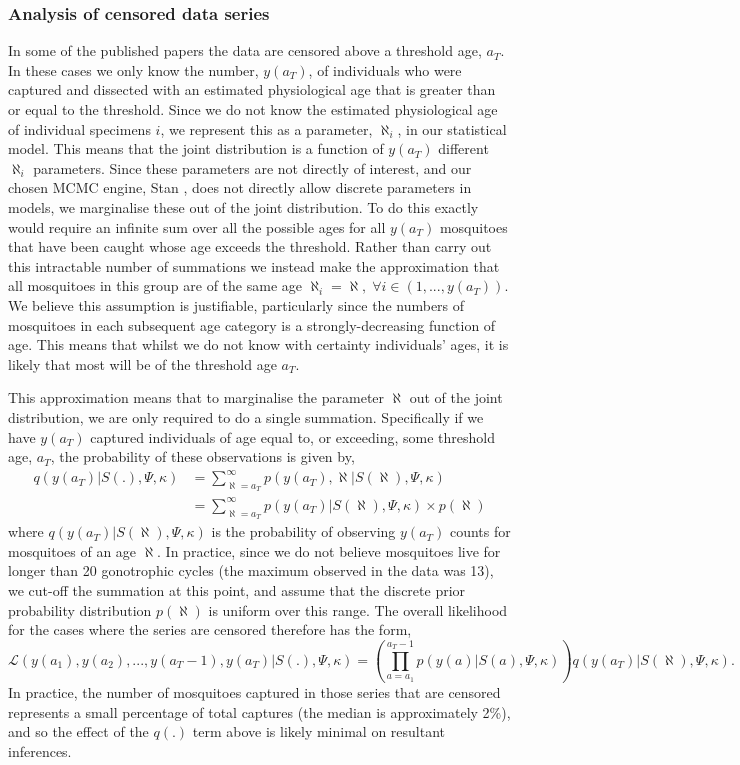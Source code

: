 \documentclass[12pt]{article}
\begin{document}
{\subsubsection{Analysis of censored data series}\label{sec:dissection_censored}
In some of the published papers the data are censored above a threshold age, $a_T$. In these cases we only know the number, $y(a_T)$, of individuals who were captured and dissected with an estimated physiological age that is greater than or equal to the threshold. Since we do not know the estimated physiological age of individual specimens $i$, we represent this as a parameter, $\aleph_i$, in our statistical model. This means that the joint distribution is a function of $y(a_T)$ different $\aleph_i$ parameters. Since these parameters are not directly of interest, and our chosen MCMC engine, Stan \citep{stan-software:2014}, does not directly allow discrete parameters in models, we marginalise these out of the joint distribution. To do this exactly would require an infinite sum over all the possible ages for all $y(a_T)$ mosquitoes that have been caught whose age exceeds the threshold. Rather than carry out this intractable number of summations we instead make the approximation that all mosquitoes in this group are of the same age $\aleph_i = \aleph,\; \forall i \in (1,...,y(a_T))$. We believe this assumption is justifiable, particularly since the numbers of mosquitoes in each subsequent age category is a strongly-decreasing function of age. This means that whilst we do not know with certainty individuals' ages, it is likely that most will be of the threshold age $a_T$.

This approximation means that to marginalise the parameter $\aleph$ out of the joint distribution, we are only required to do a single summation. Specifically if we have $y(a_T)$ captured individuals of age equal to, or exceeding, some threshold age, $a_T$, the probability of these observations is given by,
%
\begin{align}
q(y(a_T)|S(.),\Psi,\kappa) &= \sum_{\aleph=a_T}^{\infty} p(y(a_T),\aleph|S(\aleph),\Psi,\kappa)\\
&= \sum_{\aleph=a_T}^{\infty} p(y(a_T)|S(\aleph),\Psi,\kappa) \times p(\aleph)
\end{align}
%
where $q(y(a_T)|S(\aleph),\Psi,\kappa)$ is the probability of observing $y(a_T)$ counts for mosquitoes of an age $\aleph$. In practice, since we do not believe mosquitoes live for longer than 20 gonotrophic cycles (the maximum observed in the data was 13), we cut-off the summation at this point, and assume that the discrete prior probability distribution $p(\aleph)$ is uniform over this range. The overall likelihood for the cases where the series are censored therefore has the form,
%
\begin{equation}
\mathcal{L}(y(a_1),y(a_2),...,y(a_T-1),y(a_T)|S(.),\Psi,\kappa) = \left(\prod\limits_{a=a_1}^{a_T-1} p(y(a)|S(a),\Psi,\kappa)\right) q(y(a_T)|S(\aleph),\Psi,\kappa).
\end{equation}
%
In practice, the number of mosquitoes captured in those series that are censored represents a small percentage of total captures (the median is approximately 2\%), and so the effect of the $q(.)$ term above is likely minimal on resultant inferences.

}
\end{document}
